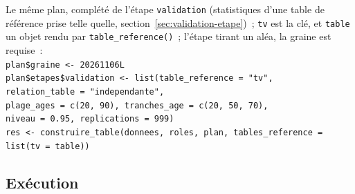 \documentclass[a4paper,11pt]{article}
\newcommand{\code}[1]{\texttt{\small #1}}
\begin{document}
\begin{encadre}
\small
Le même plan, complété de l'étape \code{validation} (statistiques d'une
table de référence prise telle quelle, section~\ref{sec:validation-etape})~;
\code{tv} est la clé, et \code{table} un objet rendu par
\code{table\_reference()}~; l'étape tirant un aléa, la graine est
requise~:\\[2pt]
\code{plan\$graine <- 20261106L}\\
\code{plan\$etapes\$validation <- list(table\_reference = "tv",}\\
\code{\phantom{plan\$etapes\$validation <- list(}relation\_table = "independante",}\\
\code{\phantom{plan\$etapes\$validation <- list(}plage\_ages = c(20, 90), tranches\_age = c(20, 50, 70),}\\
\code{\phantom{plan\$etapes\$validation <- list(}niveau = 0.95, replications = 999)}\\
\code{res <- construire\_table(donnees, roles, plan, tables\_reference = list(tv = table))}
\end{encadre}

\subsection{Exécution}
\label{sec:execution}
\end{document}
